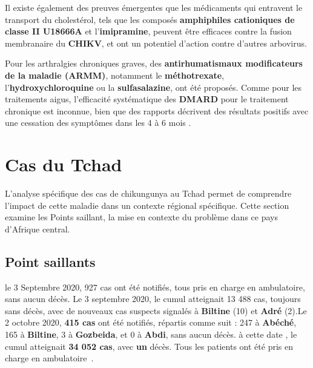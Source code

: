 Il existe également des preuves émergentes que les médicaments qui entravent le transport du cholestérol, tels que les composés \textbf{amphiphiles cationiques de classe II U18666A} et l'\textbf{imipramine}, peuvent être efficaces contre la fusion membranaire du \textbf{CHIKV}, et ont un potentiel d'action contre d'autres arbovirus.

Pour les arthralgies chroniques graves, des \textbf{antirhumatismaux modificateurs de la maladie (ARMM)}, notamment le \textbf{méthotrexate}, l'\textbf{hydroxychloroquine} ou la \textbf{sulfasalazine}, ont été proposés. Comme pour les traitements aigus, l'efficacité systématique des \textbf{DMARD} pour le traitement chronique est inconnue, bien que des rapports décrivent des résultats positifs avec une cessation des symptômes dans les 4 à 6 mois \cite{ganesan2017chikungunya}.

\section{Cas du Tchad}

L'analyse spécifique des cas de chikungunya au Tchad permet de comprendre l'impact de cette maladie dans un contexte régional spécifique. Cette section examine les Points saillant, la mise en contexte du problème dans ce pays d'Afrique central.

\subsection{Point saillants}
le 3 Septembre 2020, 927 cas ont été notifiés, tous pris en charge en ambulatoire, sans aucun décès. Le 3 septembre 2020, le cumul atteignait 13 488 cas, toujours sans décès, avec de nouveaux cas suspects signalés à \textbf{Biltine} (10) et \textbf{Adré} (2).Le 2 octobre 2020, \textbf{415 cas} ont été notifiés, répartis comme suit : 247 à \textbf{Abéché}, 165 à \textbf{Biltine}, 3 à \textbf{Gozbeida}, et 0 à \textbf{Abdi}, sans aucun décès. à cette date , le cumul atteignait \textbf{34 052 cas}, avec \textbf{un} décès. Tous les patients ont été pris en charge en ambulatoire~\cite{rapport2020oms}.

